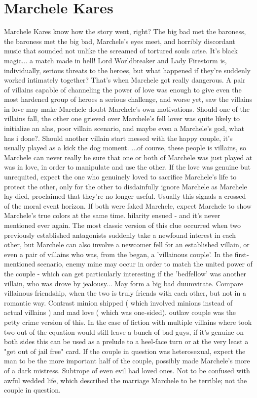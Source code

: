 \documentclass[12pt]{book}
\begin{document}
\chapter{Marchele Kares}
Marchele Kares know how the story went, right? The big bad met the baroness, the baroness met the big bad, Marchele's eyes meet, and horribly discordant music that sounded not unlike the screamed of tortured souls arise. It's black magic... a match made in hell! Lord Worldbreaker and Lady Firestorm is, individually, serious threats to the heroes, but what happened if they're suddenly worked intimately together? That's when Marchele got really dangerous. A pair of villains capable of channeling the power of love was enough to give even the most hardened group of heroes a serious challenge, and worse yet, saw the villains in love may make Marchele doubt Marchele's own motivations. Should one of the villains fall, the other one grieved over Marchele's fell lover was quite likely to initialize an alas, poor villain scenario, and maybe even a Marchele's god, what has i done?. Should another villain start messed with the happy couple, it's usually played as a kick the dog moment. ...of course, these people is villains, so Marchele can never really be sure that one or both of Marchele was just played at was in love, in order to manipulate and use the other. If the love was genuine but unrequited, expect the one who genuinely loved to sacrifice Marchele's life to protect the other, only for the other to disdainfully ignore Marchele as Marchele lay died, proclaimed that they're no longer useful. Usually this signals a crossed of the moral event horizon. If both were faked Marchele, expect Marchele to show Marchele's true colors at the same time. hilarity ensued - and it's never mentioned ever again. The most classic version of this clue occurred when two previously established antagonists suddenly take a newfound interest in each other, but Marchele can also involve a newcomer fell for an established villain, or even a pair of villains who was, from the began, a 'villainous couple'. In the first-mentioned scenario, enemy mine may occur in order to match the united power of the couple - which can get particularly interesting if the 'bedfellow' was another villain, who was drove by jealousy... May form a big bad duumvirate. Compare villainous friendship, when the two is truly friends with each other, but not in a romantic way. Contrast minion shipped ( which involved minions instead of actual villains ) and mad love ( which was one-sided). outlaw couple was the petty crime version of this. In the case of fiction with multiple villains where took two out of the equation would still leave a bunch of bad guys, if it's genuine on both sides this can be used as a prelude to a heel-face turn or at the very least a "get out of jail free" card. If the couple in question was heterosexual, expect the man to be the more important half of the couple, possibly made Marchele's more of a dark mistress. Subtrope of even evil had loved ones. Not to be confused with awful wedded life, which described the marriage Marchele to be terrible; not the couple in question.
\end{document}
